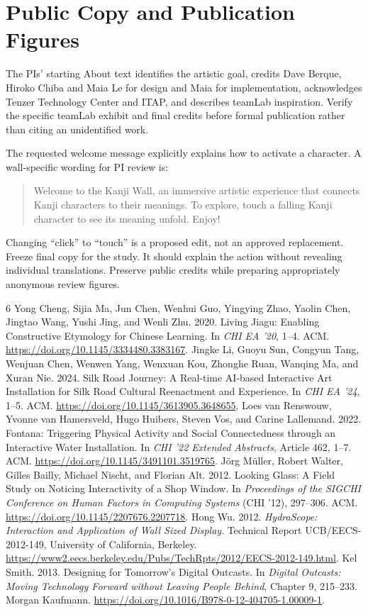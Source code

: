 \documentclass[11pt,letterpaper]{article}
\begin{document}
\section{Public Copy and Publication Figures}
The PIs' starting About text identifies the artistic goal, credits Dave Berque, Hiroko Chiba and Maia Le for design and Maia for implementation, acknowledges Tenzer Technology Center and ITAP, and describes teamLab inspiration. Verify the specific teamLab exhibit and final credits before formal publication rather than citing an unidentified work.

The requested welcome message explicitly explains how to activate a character. A wall-specific wording for PI review is:
\begin{quote}
Welcome to the Kanji Wall, an immersive artistic experience that connects Kanji characters to their meanings. To explore, touch a falling Kanji character to see its meaning unfold. Enjoy!
\end{quote}
Changing ``click'' to ``touch'' is a proposed edit, not an approved replacement. Freeze final copy for the study. It should explain the action without revealing individual translations. Preserve public credits while preparing appropriately anonymous review figures.

\newpage
\begin{thebibliography}{6}
 Yong Cheng, Sijia Ma, Jun Chen, Wenhui Guo, Yingying Zhao, Yaolin Chen, Jingtao Wang, Yushi Jing, and Wenli Zhu. 2020. Living Jiagu: Enabling Constructive Etymology for Chinese Learning. In \emph{CHI EA '20}, 1--4. ACM. \url{https://doi.org/10.1145/3334480.3383167}.
 Jingke Li, Guoyu Sun, Congyun Tang, Wenjuan Chen, Wenwen Yang, Wenxuan Kou, Zhonghe Ruan, Wanqing Ma, and Xuran Nie. 2024. Silk Road Journey: A Real-time AI-based Interactive Art Installation for Silk Road Cultural Reenactment and Experience. In \emph{CHI EA '24}, 1--5. ACM. \url{https://doi.org/10.1145/3613905.3648655}.
 Loes van Renswouw, Yvonne van Hamersveld, Hugo Huibers, Steven Vos, and Carine Lallemand. 2022. Fontana: Triggering Physical Activity and Social Connectedness through an Interactive Water Installation. In \emph{CHI '22 Extended Abstracts}, Article 462, 1--7. ACM. \url{https://doi.org/10.1145/3491101.3519765}.
 J\"org M\"uller, Robert Walter, Gilles Bailly, Michael Nischt, and Florian Alt. 2012. Looking Glass: A Field Study on Noticing Interactivity of a Shop Window. In \emph{Proceedings of the SIGCHI Conference on Human Factors in Computing Systems} (CHI '12), 297--306. ACM. \url{https://doi.org/10.1145/2207676.2207718}.
 Hong Wu. 2012. \emph{HydraScope: Interaction and Application of Wall Sized Display}. Technical Report UCB/EECS-2012-149, University of California, Berkeley. \url{https://www2.eecs.berkeley.edu/Pubs/TechRpts/2012/EECS-2012-149.html}.
 Kel Smith. 2013. Designing for Tomorrow's Digital Outcasts. In \emph{Digital Outcasts: Moving Technology Forward without Leaving People Behind}, Chapter 9, 215--233. Morgan Kaufmann. \url{https://doi.org/10.1016/B978-0-12-404705-1.00009-1}.
\end{thebibliography}
\end{document}
